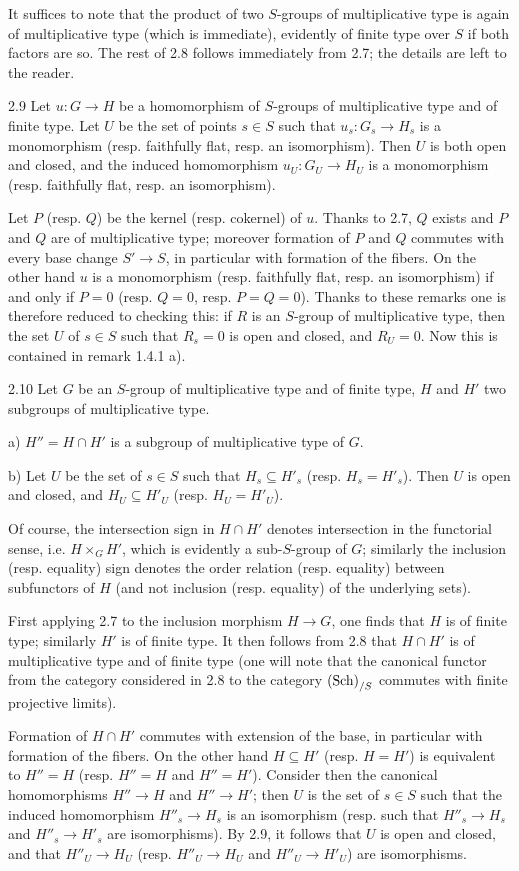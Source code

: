 It suffices to note that the product of two $S$-groups of multiplicative type is again of multiplicative type (which is immediate), evidently of finite type over $S$ if both factors are so. The rest of 2.8 follows immediately from 2.7; the details are left to the reader.
\begin{corollary}{2.9}\label{IX.2.9}
Let $u:G\to H$ be a homomorphism of $S$-groups of multiplicative type and of finite type. Let $U$ be the set of points $s\in S$ such that $u_s:G_s\to H_s$ is a monomorphism (resp. faithfully flat, resp. an isomorphism). Then $U$ is both open and closed, and the induced homomorphism $u_U:G_U\to H_U$ is a monomorphism (resp. faithfully flat, resp. an isomorphism).
\end{corollary}
Let $P$ (resp. $Q$) be the kernel (resp. cokernel) of $u$. Thanks to 2.7, $Q$ exists and $P$ and $Q$ are of multiplicative type; moreover formation of $P$ and $Q$ commutes with every base change $S'\to S$, in particular with formation of the fibers. On the other hand $u$ is a monomorphism (resp. faithfully flat, resp. an isomorphism) if and only if $P=0$ (resp. $Q=0$, resp. $P=Q=0$). Thanks to these remarks one is therefore reduced to checking this: if $R$ is an $S$-group of multiplicative type, then the set $U$ of $s\in S$ such that $R_s=0$ is open and closed, and $R_U=0$. Now this is contained in remark 1.4.1 a).
\begin{corollary}{2.10}\label{IX.2.10}
Let $G$ be an $S$-group of multiplicative type and of finite type, $H$ and $H'$ two subgroups of multiplicative type.

a) $H''=H\cap H'$ is a subgroup of multiplicative type of $G$.

b) Let $U$ be the set of $s\in S$ such that $H_s\subseteq H'_s$ (resp. $H_s=H'_s$). Then $U$ is open and closed, and $H_U\subseteq H'_U$ (resp. $H_U=H'_U$).
\end{corollary}
Of course, the intersection sign in $H\cap H'$ denotes intersection in the functorial sense, i.e. $H\times_G H'$, which is evidently a sub-$S$-group of $G$; similarly the inclusion (resp. equality) sign denotes the order relation (resp. equality) between subfunctors of $H$ (and not inclusion (resp. equality) of the underlying sets).

First applying 2.7 to the inclusion morphism $H\to G$, one finds that $H$ is of finite type; similarly $H'$ is of finite type. It then follows from 2.8 that $H\cap H'$ is of multiplicative type and of finite type (one will note that the canonical functor from the category considered in 2.8 to the category $\textup{(Sch)}_{/S}$ commutes with finite projective limits).

Formation of $H\cap H'$ commutes with extension of the base, in particular with formation of the fibers. On the other hand $H\subseteq H'$ (resp. $H=H'$) is equivalent to $H''=H$ (resp. $H''=H$ and $H''=H'$). Consider then the canonical homomorphisms $H''\to H$ and $H''\to H'$; then $U$ is the set of $s\in S$ such that the induced homomorphism $H''_s\to H_s$ is an isomorphism (resp. such that $H''_s\to H_s$ and $H''_s\to H'_s$ are isomorphisms). By 2.9, it follows that $U$ is open and closed, and that $H''_U\to H_U$ (resp. $H''_U\to H_U$ and $H''_U\to H'_U$) are isomorphisms.
